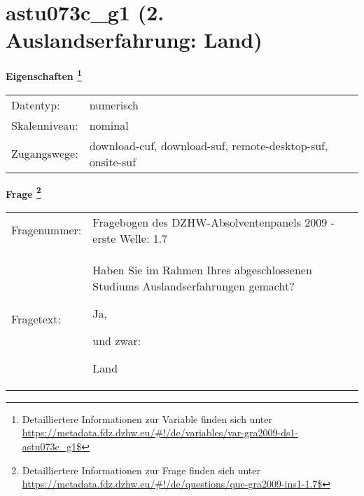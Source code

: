 
    \setcounter{footnote}{0}

    \vspace*{-1.8cm}
	\section{astu073c\_g1 (2. Auslandserfahrung: Land)}
	\label{section:astu073c_g1}



    \vspace*{0.5cm}
    \noindent\textbf{Eigenschaften
	\footnote{Detailliertere Informationen zur Variable finden sich unter
		\url{https://metadata.fdz.dzhw.eu/\#!/de/variables/var-gra2009-ds1-astu073c_g1$}}}\\
	\begin{tabularx}{\hsize}{@{}lX}
	Datentyp: & numerisch \\
	Skalenniveau: & nominal \\
	Zugangswege: &
	  download-cuf, 
	  download-suf, 
	  remote-desktop-suf, 
	  onsite-suf
 \\
    \end{tabularx}



				\vspace*{0.5cm}
                \noindent\textbf{Frage
	                \footnote{Detailliertere Informationen zur Frage finden sich unter
		              \url{https://metadata.fdz.dzhw.eu/\#!/de/questions/que-gra2009-ins1-1.7$}}}\\
				\begin{tabularx}{\hsize}{@{}lX}
					Fragenummer: &
					  Fragebogen des DZHW-Absolventenpanels 2009 - erste Welle:
					  1.7
 \\
					Fragetext: & Haben Sie im Rahmen Ihres abgeschlossenen Studiums Auslandserfahrungen gemacht?\par  Ja,\par  und zwar:\par  Land \\
				\end{tabularx}





